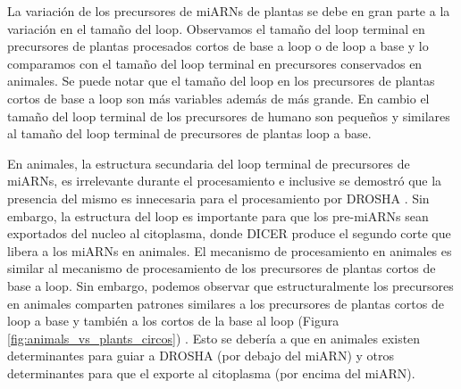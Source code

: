 La variación de los precursores de miARNs de plantas se debe en gran parte a la variación en el tamaño del loop.
Observamos el tamaño del loop terminal en precursores de plantas procesados cortos de base a loop o de loop a base y lo comparamos con el tamaño del loop terminal en precursores conservados en animales.
Se puede notar que el tamaño del loop en los precursores de plantas cortos de base a loop son más variables además de más grande.
En cambio el tamaño del loop terminal de los precursores de humano son pequeños y similares al tamaño del loop terminal de precursores de plantas loop a base.


En animales, la estructura secundaria del loop terminal de precursores de miARNs, es irrelevante durante el procesamiento e inclusive se demostró que la presencia del mismo es innecesaria para el procesamiento por DROSHA \citep{pmid16751099}.
Sin embargo, la estructura del loop es importante para que los pre-miARNs sean exportados del nucleo al citoplasma, donde DICER produce el segundo corte que libera a los miARNs en animales.
El mecanismo de procesamiento en animales es similar al mecanismo de procesamiento de los precursores de plantas cortos de base a loop.
Sin embargo, podemos observar que estructuralmente los precursores en animales comparten patrones similares a los precursores de plantas cortos de loop a base y también a los cortos de la base al loop (Figura \ref{fig:animals_vs_plants_circos}) .
Esto se debería a que en animales existen determinantes para guiar a DROSHA (por debajo del miARN) y otros determinantes para que el exporte al citoplasma (por encima del miARN).

